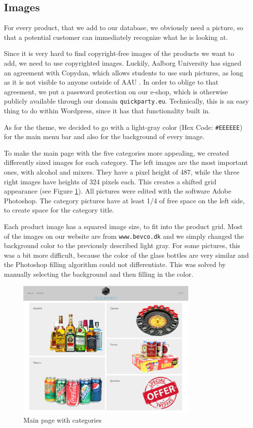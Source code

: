 \documentclass[12p]{article}
\begin{document}
\subsection{Images}

For every product, that we add to our database, we obviously need a picture, so that a potential customer can immediately recognize what he is looking at. 

Since it is very hard to find copyright-free images of the products we want to add, we need to use copyrighted images. Luckily, Aalborg University has signed an agreement with Copydan, which allows students to use such pictures, as long as it is not visible to anyone outside of AAU \cite{AAUCopyrightAgreement}. In order to oblige to that agreement, we put a password protection on our e-shop, which is otherwise publicly available through our domain \texttt{quickparty.eu}. Technically, this is an easy thing to do within Wordpress, since it has that functionality built in.

As for the theme, we decided to go with a light-gray color (Hex Code: \texttt{\#EEEEEE}) for the main menu bar and also for the background of every image. 

To make the main page with the five categories more appealing, we created differently sized images for each category. The left images are the most important ones, with alcohol and mixers. They have a pixel height of 487, while the three right images have heights of 324 pixels each. This creates a shifted grid appearance (see Figure \ref{fig:main_page}). All pictures were edited with the software Adobe Photoshop. The category pictures have at least 1/4 of free space on the left side, to create space for the category title.

Each product image has a squared image size, to fit into the product grid. Most of the images on our website are from \texttt{www.bevco.dk} and we simply changed the background color to the previously described light gray. For some pictures, this was a bit more difficult, because the color of the glass bottles are very similar and the Photoshop filling algorithm could  not differentiate. This was solved by manually selecting the background and then filling in the color.

\begin{figure}[ht]
    \centering
    \includegraphics[width=0.8\textwidth]{main_page}
    \caption{Main page with categories}
    \label{fig:main_page}
\end{figure}
\end{document}
